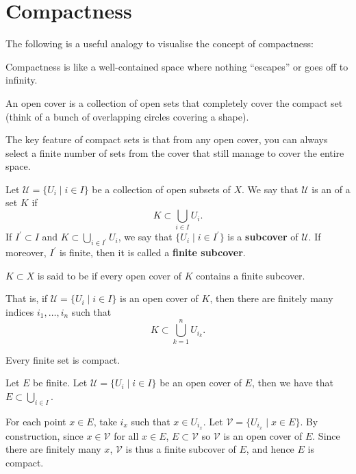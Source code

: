 \section{Compactness}
The following is a useful analogy to visualise the concept of compactness:
\begin{mdframed}
Compactness is like a well-contained space where nothing ``escapes'' or goes off to infinity.

An open cover is a collection of open sets that completely cover the compact set (think of a bunch of overlapping circles covering a shape).

The key feature of compact sets is that from any open cover, you can always select a finite number of sets from the cover that still manage to cover the entire space.
\end{mdframed}

\begin{definition}
Let $\mathcal{U}=\{U_i\mid i\in I\}$ be a collection of open subsets of $X$. We say that $\mathcal{U}$ is an  of a set $K$ if
\[K\subset\bigcup_{i\in I}U_i.\]
If $I^\prime\subset I$ and $K\subset\bigcup_{i\in I^\prime}U_i$, we say that $\{U_i\mid i\in I^\prime\}$ is a \textbf{subcover} of $\mathcal{U}$. If moreover, $I^\prime$ is finite, then it is called a \textbf{finite subcover}.
\end{definition}

\begin{definition}[Compactness]
$K\subset X$ is said to be  if every open cover of $K$ contains a finite subcover.
\end{definition}

That is, if $\mathcal{U}=\{U_i\mid i\in I\}$ is an open cover of $K$, then there are finitely many indices $i_1,\dots,i_n$ such that
\[K\subset \bigcup_{k=1}^{n}U_{i_k}.\]

\begin{exercise}
Every finite set is compact.
\end{exercise}

\begin{solution}
Let $E$ be finite. Let $\mathcal{U}=\{U_i\mid i\in I\}$ be an open cover of $E$, then we have that $E\subset\bigcup_{i\in I}$.

For each point $x\in E$, take $i_x$ such that $x\in U_{i_x}$. Let $\mathcal{V}=\{U_{i_x}\mid x\in E\}$. By construction, since $x\in\mathcal{V}$ for all $x\in E$, $E\subset\mathcal{V}$ so $\mathcal{V}$ is an open cover of $E$. Since there are finitely many $x$, $\mathcal{V}$ is thus a finite subcover of $E$, and hence $E$ is compact.
\end{solution}

